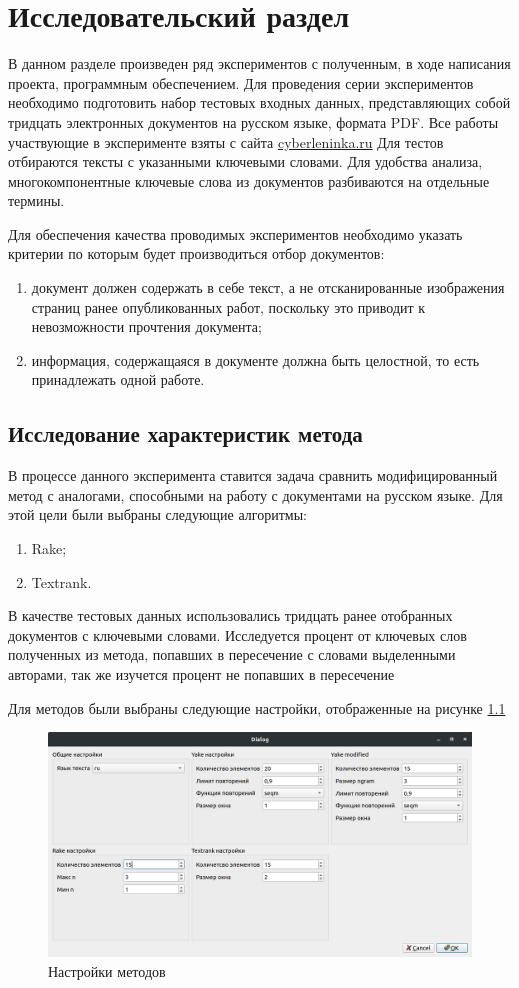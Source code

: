 \chapter{Исследовательский раздел}
В данном разделе произведен ряд экспериментов с полученным, в ходе написания проекта, программным обеспечением.
Для проведения серии экспериментов необходимо подготовить набор тестовых входных данных, представляющих собой тридцать электронных документов на русском языке, формата PDF.
Все работы участвующие в эксперименте взяты с сайта \href{https://cyberleninka.ru/article}{cyberleninka.ru}
Для тестов отбираются тексты с указанными ключевыми словами.
Для удобства анализа, многокомпонентные ключевые слова из документов разбиваются на отдельные термины.

Для обеспечения качества проводимых экспериментов необходимо указать критерии по которым будет производиться отбор документов:
\begin{enumerate}
	\item документ должен содержать в себе текст, а не отсканированные изображения страниц ранее опубликованных работ, поскольку это приводит к невозможности прочтения документа;
	\item информация, содержащаяся в документе должна быть целостной, то есть принадлежать одной работе.
\end{enumerate}

\section{Исследование характеристик метода}
В процессе данного эксперимента ставится задача сравнить модифицированный метод с аналогами, способными на работу с документами на русском языке.
Для этой цели были выбраны следующие алгоритмы:
\begin{enumerate}
	\item Rake;
	\item Textrank.
\end{enumerate}
В качестве тестовых данных использовались тридцать ранее отобранных документов с ключевыми словами.
Исследуется процент от ключевых слов полученных из метода, попавших в пересечение с словами выделенными авторами, так же изучется процент не попавших в пересечение

Для методов были выбраны следующие настройки, отображенные на рисунке \ref{fig:nbarsukov20220605a9e9}
\begin{figure}[!h]
	\centering
	\includegraphics[width=0.7\linewidth]{src/img/experiment/nbarsukov_20220605_a9e9}
	\caption{Настройки методов}
	\label{fig:nbarsukov20220605a9e9}
\end{figure}

